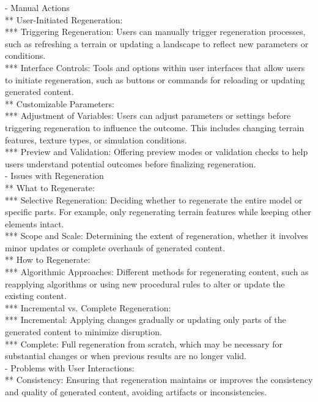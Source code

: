 - Manual Actions \\
** User-Initiated Regeneration: \\
*** Triggering Regeneration: Users can manually trigger regeneration processes, such as refreshing a terrain or updating a landscape to reflect new parameters or conditions. \\
*** Interface Controls: Tools and options within user interfaces that allow users to initiate regeneration, such as buttons or commands for reloading or updating generated content. \\
** Customizable Parameters: \\
*** Adjustment of Variables: Users can adjust parameters or settings before triggering regeneration to influence the outcome. This includes changing terrain features, texture types, or simulation conditions. \\
*** Preview and Validation: Offering preview modes or validation checks to help users understand potential outcomes before finalizing regeneration. \\
- Issues with Regeneration \\
** What to Regenerate: \\
*** Selective Regeneration: Deciding whether to regenerate the entire model or specific parts. For example, only regenerating terrain features while keeping other elements intact. \\
*** Scope and Scale: Determining the extent of regeneration, whether it involves minor updates or complete overhauls of generated content. \\
** How to Regenerate: \\
*** Algorithmic Approaches: Different methods for regenerating content, such as reapplying algorithms or using new procedural rules to alter or update the existing content. \\
*** Incremental vs. Complete Regeneration: \\
*** Incremental: Applying changes gradually or updating only parts of the generated content to minimize disruption. \\
*** Complete: Full regeneration from scratch, which may be necessary for substantial changes or when previous results are no longer valid. \\
- Problems with User Interactions: \\
** Consistency: Ensuring that regeneration maintains or improves the consistency and quality of generated content, avoiding artifacts or inconsistencies. \\
